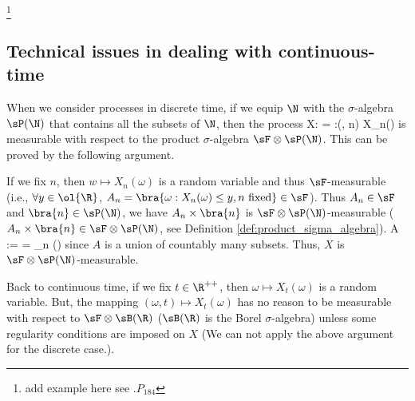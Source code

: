 \footnote{add example here see \cite{Rogers_1994}.$P_{184}$}





\subsection{Technical issues in dealing with continuous-time}

When we consider processes in discrete time, if we equip $\N$ with the $\sigma$-algebra $\sP(\N)$ that contains all the subsets of $\N$, then the process
\be
X:\Omega \times\N\to \ol{\R} = \R\cup \bra{\pm \infty}:(\omega, n) \mapsto X_n(\omega)
\ee
is measurable with respect to the product $\sigma$-algebra $\sF\otimes \sP(\N)$. This can be proved by the following argument.

If we fix $n$, then $w\mapsto X_n(\omega)$ is a random variable and thus $\sF$-measurable (i.e., $\forall y\in \ol{\R}$, $A_n = \bra{\omega:X_n(\omega) \leq y, n\text{ fixed}} \in \sF$). Thus $A_n \in \sF$ and $\bra{n} \in \sP(\N)$, we have $A_n\times \bra{n}$ is $\sF\otimes \sP(\N)$-measurable ($A_n\times \bra{n} \in \sF\otimes \sP(\N)$, see Definition \ref{def:product_sigma_algebra}). %
\be
A :=  = \bigcup_{n} \in  \sF\otimes \sP(\N)
\ee
since $A$ is a union of countably many subsets. Thus, $X$ is $\sF\otimes \sP(\N)$-measurable.




Back to continuous time, if we fix $t \in\R^{++}$, then $\omega \mapsto X_t(\omega)$ is a random variable. But, the mapping $(\omega,t) \mapsto X_t(\omega)$ has no reason to be measurable with respect to $\sF \otimes \sB(\R)$ ($\sB(\R)$ is the Borel $\sigma$-algebra) unless some regularity conditions are imposed on $X$ (We can not apply the above argument for the discrete case.).

